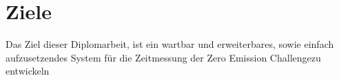 
\section{Ziele}

Das Ziel dieser Diplomarbeit, ist ein wartbar und erweiterbares, sowie einfach aufzusetzendes System für die Zeitmessung der Zero Emission Challengezu entwickeln